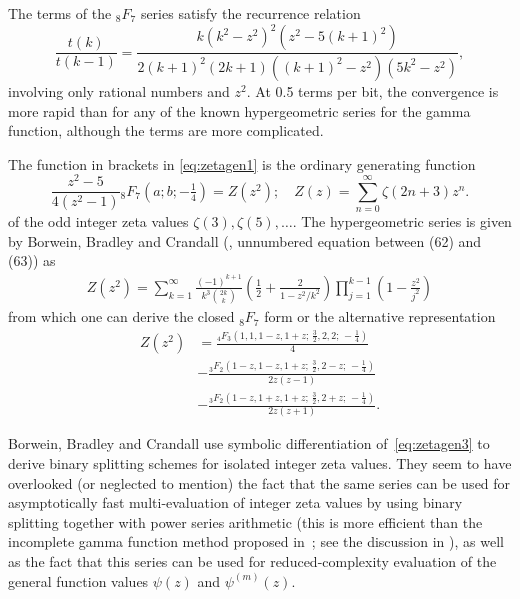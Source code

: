 \documentclass[reqno]{amsart}
\theoremstyle{definition}
\begin{document}
The terms of the ${}_8F_7$ series satisfy the recurrence relation
\begin{equation}
\frac{t(k)}{t(k-1)} = \frac{k (k^2 - z^2)^2 (z^2 - 5 (k+1)^2)}{2(k+1)^2 (2k+1) ((k+1)^2-z^2) (5k^2-z^2)},
\end{equation}
involving only rational numbers and $z^2$.
At 0.5 terms per bit, the convergence is more rapid than for any
of the known hypergeometric series for the gamma function,
although the terms are more complicated.

The function in brackets in \eqref{eq:zetagen1} is
the ordinary generating function 
\begin{equation}
\frac{z^2-5}{4 (z^2-1)} {}_8F_7 ( a; b; -\tfrac{1}{4} ) = Z(z^2); \quad Z(z) = \sum_{n=0}^{\infty} \zeta(2n+3) z^n.
\label{eq:zetagen2}
\end{equation}
of the odd integer zeta values $\zeta(3), \zeta(5), \ldots$.
The hypergeometric series is given by
Borwein, Bradley and Crandall (\cite{BorweinBradleyCrandall2000}, unnumbered equation between (62) and (63))
as
\begin{align}
Z(z^2) = \sum_{k=1}^{\infty} \frac{(-1)^{k+1}}{k^3 {2k \choose k}} \left(\frac{1}{2} + \frac{2}{1-z^2/k^2}\right) \prod_{j=1}^{k-1} \left(1 - \frac{z^2}{j^2} \right)
\label{eq:zetagen3}
\end{align}
from which one can derive the closed ${}_8F_7$ form or the alternative representation
\begin{align}
Z(z^2) & = \frac{{}_4F_3(1, 1, 1-z, 1+z;\, \tfrac{3}{2}, 2, 2;\, -\tfrac{1}{4})}{4} \\
       & - \frac{{}_3F_2(1-z, 1-z, 1+z;\, \tfrac{3}{2}, 2-z;\, -\tfrac{1}{4})}{2 z (z-1)} \\
       & - \frac{{}_3F_2(1-z, 1+z, 1+z;\, \tfrac{3}{2}, 2+z;\, -\tfrac{1}{4})}{2 z (z+1)}.
\end{align}

Borwein, Bradley and Crandall use symbolic differentiation of~\eqref{eq:zetagen3}
to derive binary splitting schemes for isolated integer zeta values.
They seem to have overlooked (or neglected to mention)
the fact that the same series can be used for asymptotically fast
multi-evaluation of integer zeta values
by using binary splitting together with power series arithmetic
(this is more efficient than the incomplete gamma function method proposed in~{\cite{BorweinBradleyCrandall2000}};
see the discussion in \cite{Johansson2014thesis}),
as well as the fact that
this series can be used for reduced-complexity evaluation of the general function values $\psi(z)$ and $\psi^{(m)}(z)$.
\end{document}
